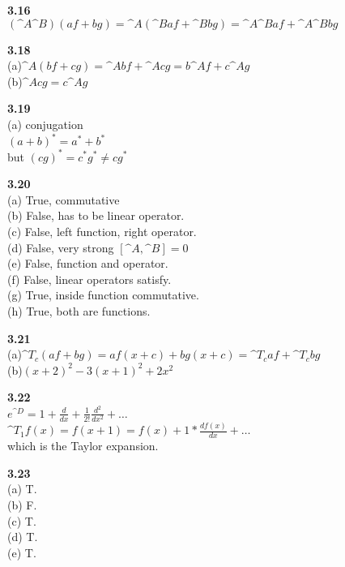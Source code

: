 \documentclass{article}
\begin{document}
\textbf{3.16}\\
$(\^{A}\^{B})(af+bg) = \^{A}(\^{B}af+\^{B}bg) = \^{A}\^{B}af + \^{A}\^{B}bg$\\
\newline

\textbf{3.18}\\
(a)$\^{A}(bf + cg) = \^{A}bf + \^{A}cg = b\^{A}f + c\^{A}g$\\
(b)$\^{A}cg = c\^Ag$\\
\newline

\textbf{3.19}\\
(a) conjugation\\
$(a+b)^* = a^*+b^*$\\
but $(cg)^* = c^*g^* \neq cg^*$\\
\newline

\textbf{3.20}\\
(a) True, commutative\\
(b) False, has to be linear operator.\\
(c) False, left function, right operator.\\
(d) False, very strong $[\^{A},\^{B}] = 0$\\
(e) False, function and operator.\\
(f) False, linear operators satisfy.\\
(g) True, inside function commutative.\\
(h) True, both are functions.\\
\newline

\textbf{3.21}\\
(a)$\^{T}_c(af+bg) = af(x+c) + bg(x+c) = \^{T}_caf + \^{T}_cbg$\\
(b)$(x+2)^2 - 3(x+1)^2+2x^2$\\
\newline

\textbf{3.22}\\
$e^{\^{D}} = 1+\frac{d}{dx}+\frac{1}{2!}\frac{d^2}{dx^2}+\dots$\\
$\^{T}_1f(x) = f(x+1) = f(x) + 1*\frac{df(x)}{dx}+\dots$\\
which is the Taylor expansion.\\
\newline

\textbf{3.23}\\
(a) T.\\
(b) F.\\
(c) T.\\
(d) T.\\
(e) T.\\
\newline
\end{document}
